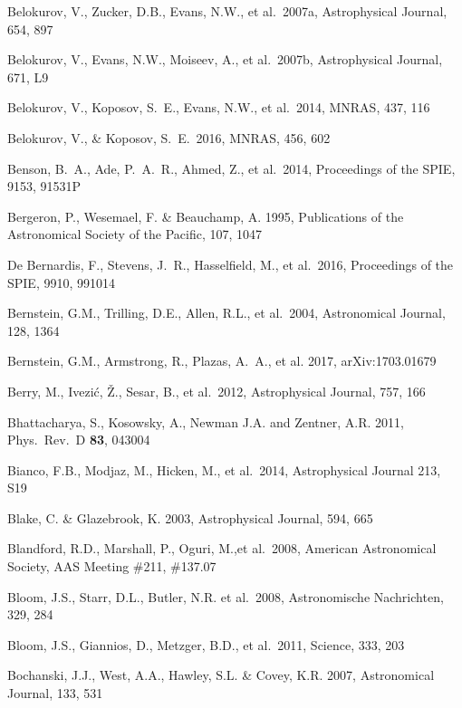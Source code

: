 \documentclass[twocolumn]{aastex61}
\begin{document}
\begin{thebibliography}{}
\bibitem[()]{} Belokurov, V., Zucker, D.B., Evans, N.W., et al.~2007a, Astrophysical Journal, 654, 897

\bibitem[()]{} Belokurov, V., Evans, N.W., Moiseev, A., et al.~2007b, Astrophysical Journal, 671, L9

\bibitem[()]{} Belokurov, V., Koposov, S.~E., Evans, N.W., et al.~2014, MNRAS, 437, 116

\bibitem[()]{} Belokurov, V., \& Koposov, S.~E.\ 2016, MNRAS, 456, 602

\bibitem[()]{} Benson, B.~A., Ade, P.~A.~R., Ahmed, Z., et al.\ 2014, Proceedings of the SPIE, 9153, 91531P

\bibitem[()]{} Bergeron, P., Wesemael, F. \& Beauchamp, A. 1995, Publications of the Astronomical Society
                            of the Pacific, 107, 1047

\bibitem[()]{} De Bernardis, F., Stevens, J.~R., Hasselfield, M., et al.\ 2016, Proceedings of the SPIE, 9910, 991014

\bibitem[()]{} Bernstein, G.M., Trilling, D.E., Allen, R.L., et al.~2004, Astronomical Journal, 128, 1364

\bibitem[()]{} Bernstein, G.M., Armstrong, R., Plazas, A.~A., et al. 2017, arXiv:1703.01679

\bibitem[()]{} Berry, M., Ivezi\'c, \v Z., Sesar, B., et al.~2012, Astrophysical Journal, 757, 166

\bibitem[()]{} Bhattacharya, S., Kosowsky, A., Newman J.A. and Zentner, A.R. 2011, Phys.\ Rev.\ D {\bf 83}, 043004

\bibitem[()]{} Bianco, F.B., Modjaz, M., Hicken, M., et al.~2014, Astrophysical Journal 213, S19

\bibitem[()]{} Blake, C. \& Glazebrook, K. 2003, Astrophysical Journal, 594, 665

\bibitem[()]{} Blandford, R.D., Marshall, P., Oguri, M.,et al.~2008,
                           American Astronomical Society, AAS Meeting \#211, \#137.07

\bibitem[()]{} Bloom, J.S., Starr, D.L., Butler, N.R. et al.~2008, Astronomische Nachrichten, 329, 284


\bibitem[()]{} Bloom, J.S., Giannios, D., Metzger, B.D., et al.~2011, Science, 333, 203

\bibitem[()]{} Bochanski, J.J., West, A.A., Hawley, S.L. \& Covey, K.R. 2007, Astronomical Journal, 133, 531


\end{thebibliography}
\end{document}
